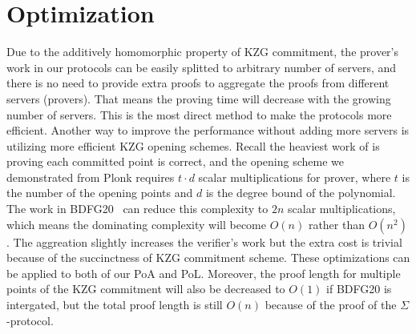 \section{Optimization}
\label{sec:opt}
Due to the additively homomorphic property of KZG commitment, the prover's work in our protocols can be easily splitted to arbitrary number of servers, and there is no need to provide extra proofs to aggregate the proofs from different servers (provers). That means the proving time will decrease with the growing number of servers. This is the most direct method to make the protocols more efficient. Another way to improve the performance without adding more servers is utilizing more efficient KZG opening schemes. Recall the heaviest work of \bootstrap is proving each committed point is correct, and the opening scheme we demonstrated from Plonk requires $t\cdot{d}$ scalar multiplications for prover, where $t$ is the number of the opening points and $d$ is the degree bound of the polynomial. The work in BDFG20~\cite{bdfg} can reduce this complexity to $2n$ scalar multiplications, which means the dominating complexity will become $O(n)$ rather than $O(n^2)$. The aggreation slightly increases the verifier's work but the extra cost is trivial because of the succinctness of KZG commitment scheme. These optimizations can be applied to both of our PoA and PoL. Moreover, the proof length for multiple points of the KZG commitment will also be decreased to $O(1)$ if BDFG20 is intergated, but the total proof length is still $O(n)$ because of the proof of the $\Sigma$-protocol.

